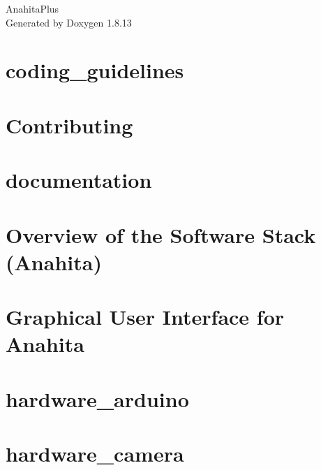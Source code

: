 \documentclass[twoside]{book}
\newcommand{\+}{\discretionary{\mbox{\scriptsize$\hookleftarrow$}}{}{}}
\newcommand{\clearemptydoublepage}{%
  \newpage{\pagestyle{empty}\cleardoublepage}%
}
\begin{document}
\hypersetup{pageanchor=false,
             bookmarksnumbered=true,
             pdfencoding=unicode
            }
\begin{titlepage}
\vspace*{7cm}
\begin{center}%
{\Large Anahita\+Plus }\\
\vspace*{1cm}
{\large Generated by Doxygen 1.8.13}\\
\end{center}
\end{titlepage}
\clearemptydoublepage
{}
\tableofcontents
\clearemptydoublepage
{}
\hypersetup{pageanchor=true}

\chapter{coding\+\_\+guidelines}
\label{md_coding_docs_coding_guidelines}

\chapter{Contributing}
\label{autotoc_md14}

\chapter{documentation}
\label{md_coding_docs_documentation}

\chapter{Overview of the Software Stack (Anahita)}
\label{autotoc_md17}

\chapter{Graphical User Interface for Anahita}
\label{autotoc_md25}

\chapter{hardware\+\_\+arduino}
\label{autotoc_md28}

\chapter{hardware\+\_\+camera}
\label{autotoc_md43}

\end{document}

